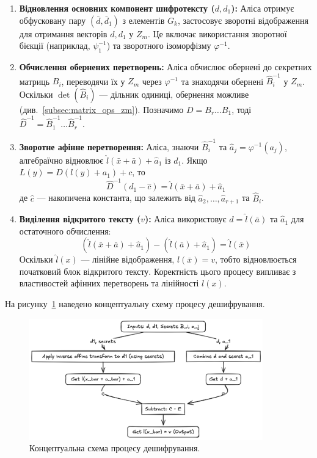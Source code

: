 \begin{enumerate}
    \item \textbf{Відновлення основних компонент шифротексту ($d, d_1$):} Аліса отримує обфусковану пару $(\bar{d}, \bar{d}_1)$ з елементів $G_k$, застосовує зворотні відображення для отримання векторів $d, d_1$ у $Z_m$.
    Це включає використання зворотної бієкції (наприклад, $\psi_1^{-1}$) та зворотного ізоморфізму $\varphi^{-1}$.

    \item \textbf{Обчислення обернених перетворень:} Аліса обчислює обернені до секретних матриць $B_i$, переводячи їх у $Z_m$ через $\varphi^{-1}$ та знаходячи обернені $\hat{B}_i^{-1}$ у $Z_m$.
    Оскільки $\det(\hat{B}_i)$ — дільник одиниці, обернення можливе (див.~\ref{subsec:matrix_ops_zm}).
    Позначимо $D = B_r \ldots B_1$, тоді $\hat{D}^{-1} = \hat{B}_1^{-1} \ldots \hat{B}_r^{-1}$.

    \item \textbf{Зворотне афінне перетворення:} Аліса, знаючи $\hat{B}_i^{-1}$ та $\hat{a}_j = \varphi^{-1}(a_j)$, алгебраїчно відновлює $\hat{l}(\bar{x} + \bar{a}) + \hat{a}_1$ із $d_1$.
    Якщо $L(y) = D(l(y) + a_1) + c$, то
    \[
        \hat{D}^{-1}(d_1 - \hat{c}) = \hat{l}(\bar{x} + \bar{a}) + \hat{a}_1
    \]
    де $\hat{c}$ — накопичена константа, що залежить від $\hat{a}_2, \ldots, \hat{a}_{r+1}$ та $\hat{B}_i$.

    \item \textbf{Виділення відкритого тексту ($v$):} Аліса використовує $d = \hat{l}(\bar{a})$ та $\hat{a}_1$ для остаточного обчислення:
    \[
        (\hat{l}(\bar{x} + \bar{a}) + \hat{a}_1) - (\hat{l}(\bar{a}) + \hat{a}_1) = \hat{l}(\bar{x})
    \]
    Оскільки $\hat{l}(x)$ — лінійне відображення, $\hat{l}(\bar{x}) = v$, тобто відновлюється початковий блок відкритого тексту.
    Коректність цього процесу випливає з властивостей афінних перетворень та лінійності $l(x)$.
\end{enumerate}

На рисунку~\ref{fig:decryption_logic} наведено концептуальну схему процесу дешифрування.
\begin{figure}[ht]
    \centering
    \includegraphics[width=0.9\textwidth]{pictures/Decryption Core Logic Conceptual Diagram}
    \caption{Концептуальна схема процесу дешифрування.}
    \label{fig:decryption_logic}
\end{figure}

